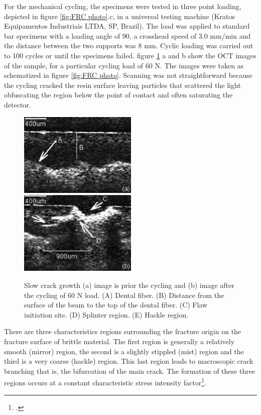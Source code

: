 \documentclass[12pt,twoside,english]{book}
\renewcommand{\~}{\perispomeni}%
\numberwithin{equation}{section}
\numberwithin{figure}{section}
\begin{document}
For the mechanical cycling, the specimens were tested in three point loading, depicted in figure \ref{fig:FRC photo}.c, in a universal testing machine (Kratos Equipamentos Industriais LTDA, SP, Brazil). The load was applied to standard bar specimens with a loading angle of 90\textdegree{}, a crosshead speed of 3.0 mm/min and the distance between the two supports was 8 mm. Cyclic loading was carried out to 100 cycles or until the specimens failed. figure \ref{fig:FRC before and after} a and b show the OCT images of the sample, for a particular cycling load of 60 N. The images were taken as schematized in figure \ref{fig:FRC photo}. Scanning was not straightforward because the cycling cracked the resin surface leaving particles that scattered the light obfuscating the region below the point of contact and often saturating the detector. 
\begin{figure}[h]
\centering\includegraphics[height=4cm]{frc-2-a}
\centering\includegraphics[height=4cm]{frc-2-b}
\caption{Slow crack growth (a) image is prior the cycling and (b) image after the cycling of 60 N load. (A) Dental fiber. (B) Distance from the surface of the beam to the top of the dental fiber. (C) Flaw initiation site. (D) Splinter region. (E) Hackle region.\label{fig:FRC before and after}}
\end{figure}

There are three characteristics regions surrounding the fracture origin on the fracture surface of brittle material. The first region is generally a relatively smooth (mirror) region, the second is a slightly stippled (mist) region and the third is a very coarse (hackle) region. This last region leads to macroscopic crack branching that is, the bifurcation of the main crack. The formation of these three regions occurs at a constant characteristic stress intensity factor\footcite{Mecholsky:1995p2523}. 
\end{document}
